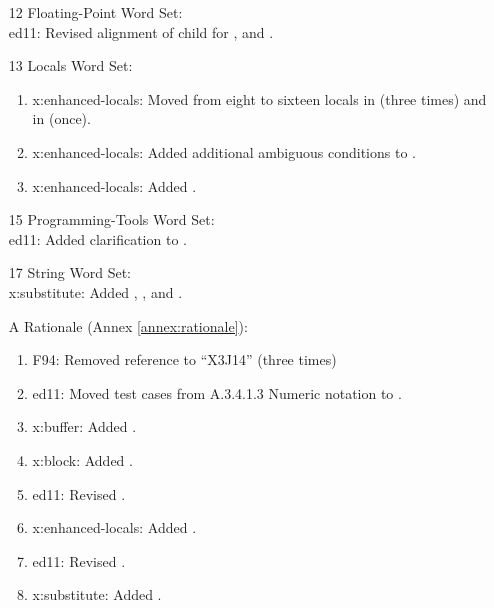 \begin{itemize}
	\item[12] Floating-Point Word Set: \\		%
		\textsf{ed11}: Revised alignment of child for
			,
			 and
			.

	\item[13] Locals Word Set:						%
		\begin{enumerate}
		\item \textsf{x:enhanced-locals}:
			Moved from eight to sixteen locals in
			 (three times)
			and in  (once).
		\item \textsf{x:enhanced-locals}:
			Added additional ambiguous conditions to
			.
		\item \textsf{x:enhanced-locals}:
			Added .
		\end{enumerate}

	\item[15] Programming-Tools Word Set: \\	%
		\textsf{ed11}: Added clarification to .

	\item[17] String Word Set: \\					%
		\textsf{x:substitute}:
			Added ,
			,
			 and
			.

	\item[A] Rationale								(Annex \ref{annex:rationale}):
		\begin{enumerate}
		\item \textsf{F94}: Removed reference to ``X3J14'' (three times)
		\item \textsf{ed11}: Moved test cases from A.3.4.1.3 Numeric notation to .
		\item \textsf{x:buffer}: Added .
		\item \textsf{x:block}: Added .
		\item \textsf{ed11}: Revised .
		\item \textsf{x:enhanced-locals}:
			Added .
		\item \textsf{ed11}: Revised .
		\item \textsf{x:substitute}: Added .
		\end{enumerate}
		

\end{itemize}
